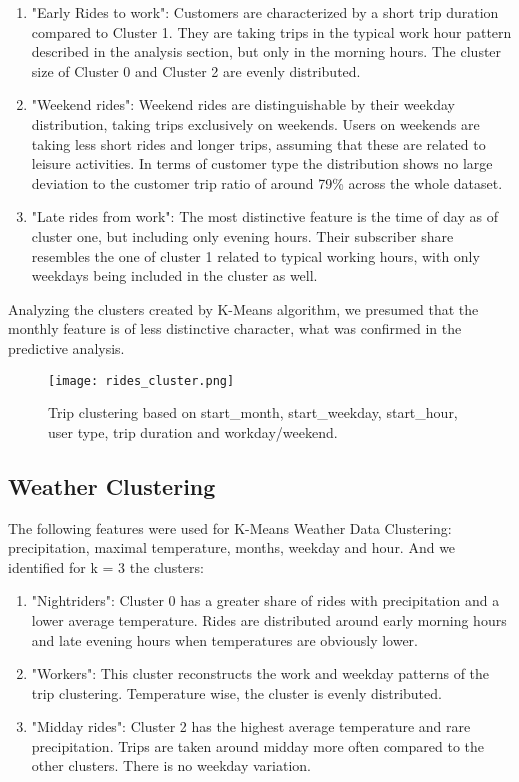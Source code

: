\begin{enumerate}[start=0]
    \item "Early Rides to work": Customers are characterized by a short trip duration compared to Cluster 1. They are taking trips in the typical
    work hour pattern described in the analysis section, but only in the morning hours. The cluster size of Cluster 0 and Cluster 2 are evenly distributed.
    \item "Weekend rides": Weekend rides are distinguishable by their weekday distribution, taking trips exclusively on weekends. Users on weekends
    are taking less short rides and longer trips, assuming that these are related to leisure activities. In terms of customer type the distribution shows no large deviation to the
    customer trip ratio of around 79\% across the whole dataset.
    \item "Late rides from work": The most distinctive feature is the time of day as of cluster one, but including only evening hours. Their subscriber share resembles
    the one of cluster 1 related to typical working hours, with only weekdays being included in the cluster as well.
\end{enumerate}

Analyzing the clusters created by K-Means algorithm, we presumed that the monthly feature is of less distinctive character, what was confirmed in
the predictive analysis.

\begin{figure}[hbtp]
    \texttt{[image: rides\_cluster.png]}   
    \caption{Trip clustering based on start\_month, start\_weekday, start\_hour, user type, trip duration and workday/weekend.}
\end{figure}

\subsection{Weather Clustering}
The following features were used for K-Means Weather Data Clustering: precipitation, maximal temperature, months, weekday and hour. And we identified for k = 3 the clusters:

\begin{enumerate}[start=0]
    \item "Nightriders": Cluster 0 has a greater share of rides with precipitation and a lower average temperature. Rides are distributed around early morning hours and late evening hours when temperatures are obviously lower. 

    \item "Workers": This cluster reconstructs the work and weekday patterns of the trip clustering. Temperature wise, the cluster is evenly distributed.
 
    \item "Midday rides": Cluster 2 has the highest average temperature and rare precipitation. Trips are taken around midday more often compared to the other clusters. There is no weekday variation. 
\end{enumerate}

